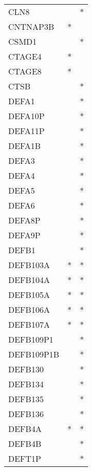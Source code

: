 \begin{longtable}{lcc}
CLN8         &                &          * \\
CNTNAP3B     &              * &            \\
CSMD1        &                &          * \\
CTAGE4       &              * &            \\
CTAGE8       &              * &            \\
CTSB         &                &          * \\
DEFA1        &                &          * \\
DEFA10P      &                &          * \\
DEFA11P      &                &          * \\
DEFA1B       &                &          * \\
DEFA3        &                &          * \\
DEFA4        &                &          * \\
DEFA5        &                &          * \\
DEFA6        &                &          * \\
DEFA8P       &                &          * \\
DEFA9P       &                &          * \\
DEFB1        &                &          * \\
DEFB103A     &              * &          * \\
DEFB104A     &              * &          * \\
DEFB105A     &              * &          * \\
DEFB106A     &              * &          * \\
DEFB107A     &              * &          * \\
DEFB109P1    &                &          * \\
DEFB109P1B   &                &          * \\
DEFB130      &                &          * \\
DEFB134      &                &          * \\
DEFB135      &                &          * \\
DEFB136      &                &          * \\
DEFB4A       &              * &          * \\
DEFB4B       &                &          * \\
DEFT1P       &                &          * \\

\end{longtable}
